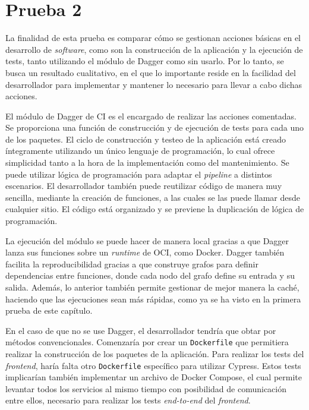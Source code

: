 \section{Prueba 2}

La finalidad de esta prueba es comparar cómo se gestionan acciones básicas en el desarrollo de \textit{software}, como son la construcción de la aplicación y la ejecución de tests, tanto utilizando el módulo de Dagger como sin usarlo. Por lo tanto, se busca un resultado cualitativo, en el que lo importante reside en la facilidad del desarrollador para implementar y mantener lo necesario para llevar a cabo dichas acciones.

El módulo de Dagger de CI es el encargado de realizar las acciones comentadas. Se proporciona una función de construcción y de ejecución de tests para cada uno de los paquetes. El ciclo de construcción y testeo de la aplicación está creado íntegramente utilizando un único lenguaje de programación, lo cual ofrece simplicidad tanto a la hora de la implementación como del mantenimiento. Se puede utilizar lógica de programación para adaptar el \textit{pipeline} a distintos escenarios. El desarrollador también puede reutilizar código de manera muy sencilla, mediante la creación de funciones, a las cuales se las puede llamar desde cualquier sitio. El código está organizado y se previene la duplicación de lógica de programación.

La ejecución del módulo se puede hacer de manera local gracias a que Dagger lanza sus funciones sobre un \textit{runtime} de OCI, como Docker. Dagger también facilita la reproducibilidad gracias a que construye grafos para definir dependencias entre funciones, donde cada nodo del grafo define su entrada y su salida. Además, lo anterior también permite gestionar de mejor manera la caché, haciendo que las ejecuciones sean más rápidas, como ya se ha visto en la primera prueba de este capítulo.

En el caso de que no se use Dagger, el desarrollador tendría que obtar por métodos convencionales. Comenzaría por crear un \texttt{Dockerfile} que permitiera realizar la construcción de los paquetes de la aplicación. Para realizar los tests del \textit{frontend}, haría falta otro \texttt{Dockerfile} específico para utilizar Cypress. Estos tests implicarían también implementar un archivo de Docker Compose, el cual permite levantar todos los servicios al mismo tiempo con posibilidad de comunicación entre ellos, necesario para realizar los tests \textit{end-to-end} del \textit{frontend}. 

